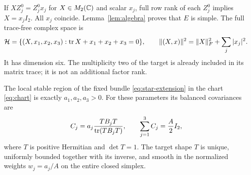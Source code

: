 If $XZ_j^0=Z_j^0x_j$ for $X\in M_2(\mathbb C)$ and scalar $x_j$,
full row rank of each $Z_j^0$ implies $X=x_jI_2$.
All $x_j$ coincide. Lemma~\ref{lem:algebra} proves that $E$ is
simple. The full trace-free complex space is
\begin{equation}\label{eq:starspace}
\mathcal H=\{(X,x_1,x_2,x_3):\operatorname{tr} X+x_1+x_2+x_3=0\},\qquad
\|(X,x)\|^2=\|X\|_F^2+\sum_j|x_j|^2.
\end{equation}
It has dimension six. The multiplicity two of the target is
already included in its matrix trace; it is not an additional
factor rank.

\begin{proposition}\label{prop:starbalance}
The local stable region of the fixed bundle \eqref{eq:star-extension}
in the chart \eqref{eq:chart} is exactly $a_1,a_2,a_3>0$.
For these parameters its balanced covariances are
\begin{equation}\label{eq:targetbalance}
C_j=a_j\frac{TB_jT}{\operatorname{tr}(TB_jT)},\qquad
\sum_{j=1}^3C_j=\frac A2I_2,
\end{equation}
where $T$ is positive Hermitian and $\det T=1$.
The target shape $T$ is unique, uniformly bounded together with
its inverse, and smooth in the normalized weights $w_j=a_j/A$
on the entire closed simplex.
\end{proposition}

